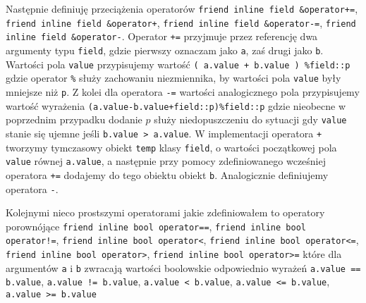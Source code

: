 \documentclass{article}
\begin{document}
Następnie definiuję przeciążenia operatorów 
\texttt{friend inline field \&operator+=},
\texttt{friend inline field \&operator+},
\texttt{friend inline field \&operator-=},
\texttt{friend inline field \&operator-}. Operator
\texttt{+=} przyjmuje przez referencję dwa argumenty typu \texttt{field},
gdzie pierwszy oznaczam jako \texttt{a}, zaś drugi jako \texttt{b}. Wartości pola
\texttt{value} przypisujemy wartość \texttt{( a.value + b.value ) \%field::p} gdzie 
operator \texttt{\%} służy zachowaniu niezmiennika, by wartości pola \texttt{value}
były mniejsze niż \texttt{p}. Z kolei dla operatora \texttt{-=} wartości analogicznego
pola przypisujemy wartość wyrażenia \texttt{(a.value-b.value+field::p)\%field::p}
gdzie nieobecne w poprzednim przypadku dodanie $p$ służy niedopuszczeniu
do sytuacji gdy \texttt{value} stanie się ujemne jeśli \texttt{b.value > a.value}.
W implementacji operatora \texttt{+} tworzymy tymczasowy obiekt \texttt{temp} klasy 
\texttt{field}, o wartości
początkowej pola \texttt{value} równej \texttt{a.value}, a następnie
przy pomocy zdefiniowanego wcześniej operatora \texttt{+=} dodajemy do tego obiektu
obiekt \texttt{b}. Analogicznie definiujemy operatora \texttt{-}.

Kolejnymi nieco prostszymi operatorami jakie zdefiniowałem to operatory porownójące
\texttt{friend inline bool operator==}, 
\texttt{friend inline bool operator!=}, 
\texttt{friend inline bool operator<},
\texttt{friend inline bool operator<=}, 
\texttt{friend inline bool operator>}, 
\texttt{friend inline bool operator>=} 
które dla argumentów \texttt{a} i \texttt{b} zwracają wartości boolowskie 
odpowiednio wyrażeń 
\texttt{a.value == b.value}, 
\texttt{a.value != b.value},
\texttt{a.value < b.value},
\texttt{a.value <= b.value},
\texttt{a.value >= b.value}
\end{document}
